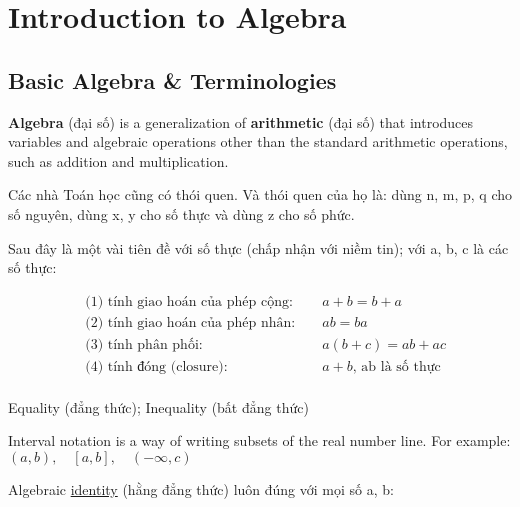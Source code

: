 \chapter{Introduction to Algebra}

\section{Basic Algebra \& Terminologies}

\textbf{Algebra} (đại số) is a generalization of \textbf{arithmetic} (đại số) that introduces variables and algebraic operations other than the standard arithmetic operations, such as addition and multiplication.

\vspace{5mm}

Các nhà Toán học cũng có thói quen. Và thói quen của họ là: dùng n, m, p, q cho số nguyên, dùng x, y cho số thực và dùng z cho số phức.

Sau đây là một vài tiên đề với số thực (chấp nhận với niềm tin); với a, b, c là các số thực:

\begin{equation}
    \begin{aligned}
      &\text{(1) tính giao hoán của phép cộng: } &&a+b = b+a\\
      &\text{(2) tính giao hoán của phép nhân: } &&ab = ba\\
      &\text{(3) tính phân phối: } &&a(b+c) = ab + ac\\
      &\text{(4) tính đóng (closure): } &&a + b \text{, ab là số thực}\\
    \end{aligned}
    \label{key}
\end{equation}

Equality (đẳng thức); Inequality (bất đẳng thức)

Interval notation is a way of writing subsets of the real number line. For example: \((a,b),\quad [a,b],\quad (-\infty, c)\)

\vspace{10 mm}

Algebraic \href{https://en.wikipedia.org/wiki/Identity_(mathematics)}{identity} (hằng đẳng thức) luôn đúng với mọi số a, b:


